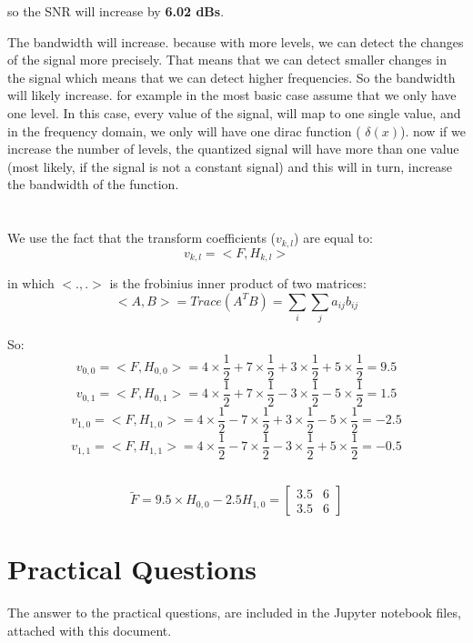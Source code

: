 \documentclass[12pt]{article}
\begin{document}
so the SNR will increase by \textbf{6.02 dBs}.

The bandwidth will increase. because  with more levels, we can detect the changes of the signal more precisely. That means that we can detect smaller changes in the signal which means that we can detect higher frequencies. So the bandwidth will likely increase. for example in the most basic case assume that we only have one level. In this case, every value of the signal, will map to one single value, and in the frequency domain, we only will have one dirac function ( $\delta(x)$). now if we increase the number of levels, the quantized signal will have more than one value (most likely, if the signal is not a constant signal) and this will in turn, increase the bandwidth of the function.

\section{}
\subsection{}
We use the fact that the transform coefficients ($v_{k,l}$) are equal to:
$$v_{k,l} = <F,H_{k,l}>$$

in which $<., .>$ is the frobinius inner product of two matrices:
$$<A, B> = Trace(A^TB) = \sum_{i}\sum_{j} a_{ij}b_{ij}$$

So:
$$v_{0,0}  =<F,H_{0,0}> = 4 \times \frac{1}{2} + 7\times \frac{1}{2}+ 3\times \frac{1}{2} + 5\times \frac{1}{2} = 9.5$$
$$v_{0,1}  =<F,H_{0,1}> = 4 \times \frac{1}{2} + 7\times \frac{1}{2} -3\times \frac{1}{2}  -5\times \frac{1}{2} = 1.5$$
$$v_{1,0}  =<F,H_{1,0}> = 4 \times \frac{1}{2} - 7\times \frac{1}{2}+ 3\times \frac{1}{2} - 5\times \frac{1}{2} = -2.5$$
$$v_{1,1}  =<F,H_{1,1}> = 4 \times \frac{1}{2} - 7\times \frac{1}{2}- 3\times \frac{1}{2} + 5\times \frac{1}{2} = -0.5$$
\subsection{}

$$\tilde{F} = 9.5 \times H_{0,0} -2.5 H_{1, 0} = \begin{bmatrix} 3.5 & 6 \\ 3.5 & 6\end{bmatrix}$$

\section{Practical Questions}

The answer to the practical questions, are included in the Jupyter notebook files, attached with this document.
\end{document}
